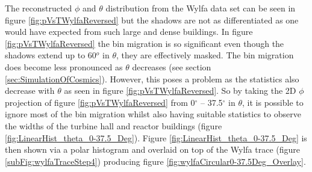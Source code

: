 The reconstructed $\phi$ and $\theta$ distribution from the Wylfa data set can be seen in figure \ref{fig:pVsTWylfaReversed} but the shadows are not as differentiated as one would have expected from such large and dense buildings. In figure \ref{fig:pVsTWylfaReversed} the bin migration is so significant even though the shadows extend up to 60$^o$ in $\theta$, they are effectively masked. The bin migration does become less pronounced as $\theta$ decreases (see section \ref{sec:SimulationOfCosmics}). However, this poses a problem as the statistics also decrease with $\theta$ as seen in figure \ref{fig:pVsTWylfaReversed}. So by taking the 2D $\phi$ projection of figure \ref{fig:pVsTWylfaReversed} from 0$^\circ$ -- 37.5$^\circ$ in $\theta$, it is possible to ignore most of the bin migration whilst also having suitable statistics to observe the widths of the turbine hall and reactor buildings (figure \ref{fig:LinearHist_theta_0-37.5_Deg}). Figure \ref{fig:LinearHist_theta_0-37.5_Deg} is then shown via a polar histogram and overlaid on top of the Wylfa trace (figure \ref{subFig:wylfaTraceStep4}) producing figure \ref{fig:wylfaCircular0-37.5Deg_Overlay}. 

